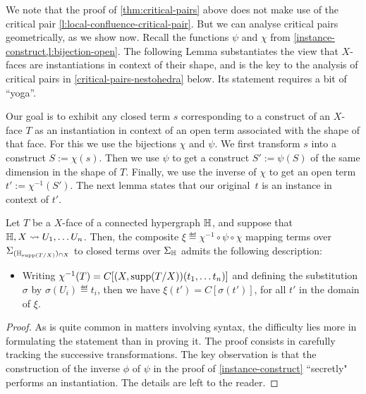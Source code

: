 We note that the  proof of \cref{thm:critical-pairs} above  does not make use of the critical pair \cref{l:local-confluence-critical-pair}. But we can analyse critical pairs geometrically, as we show now.
Recall the functions $\psi$ and $\chi$ from 
 \cref{instance-construct,l:bijection-open}.
The following Lemma substantiates the view that $X$-faces are instantiations in context of their shape, and is the key to the analysis of critical pairs in \cref{critical-pairs-nestohedra} below. 
Its statement requires a bit of ``yoga''.
 
Our goal is to exhibit any closed term $s$ corresponding to a construct of an $X$-face $T$ as an instantiation in context  of an open term associated with the shape of that face.
For this we use the bijections $\chi$ and $\psi$. We first transform $s$ into a construct $S:=\chi(s)$. 
Then we use $\psi$ to get a construct $S':=\psi(S)$ of the same dimension in the shape of $T$. 
Finally, we use the inverse of $\chi$ to get an open term
$t':=\chi^{-1}(S')$. 
The next lemma states that our original~$t$ is an instance in context of $t'$.

\begin{lemma} 
  \label{instance-in-context}
Let $T$ be a $X$-face of a connected hypergraph ${\mathbb H}$, and suppose that ${\mathbb H},X\leadsto U_1,\ldots U_n$. 
Then, the composite $\xi\eqdef \chi^{-1}\circ \psi\circ \chi$ mapping terms over $\Sigma_{({\mathbb H}_{\mathrm{supp}(T/X)})_{\cap X}}$ to closed terms over $\Sigma_{{\mathbb H}}$ admits the following description: 
\begin{itemize}
  \item Writing $\chi^{-1}(T)=C[(X,\mathrm{supp}(T/X))(t_1,\ldots t_n)]$ and defining the substitution $\sigma$ by $\sigma(U_i)\eqdef t_i$, then we have $\xi(t')=C[\sigma(t')]$, for all $t'$ in the domain of $\xi$.
\end{itemize}

\end{lemma}

\begin{proof}
As is quite common in matters involving syntax, the difficulty lies more in formulating the statement than in proving it. The proof consists in carefully tracking the successive transformations. 
The key observation is that the construction of the inverse $\phi$ of $\psi$ in the proof of \cref{instance-construct} ``secretly" performs an instantiation. 
The details are left to the reader.
\end{proof}



